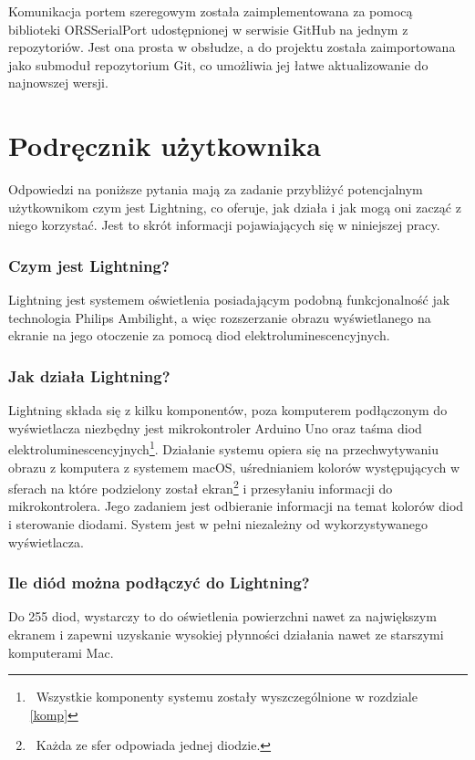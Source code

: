 \documentclass[12pt]{report}
\begin{document}
Komunikacja portem szeregowym została zaimplementowana za pomocą biblioteki ORSSerialPort udostępnionej w serwisie GitHub na jednym z repozytoriów. Jest ona prosta w obsłudze, a do projektu została zaimportowana jako submoduł repozytorium Git, co umożliwia jej łatwe aktualizowanie do najnowszej wersji.

\section{Podręcznik użytkownika}

Odpowiedzi na poniższe pytania mają za zadanie przybliżyć potencjalnym użytkownikom czym jest Lightning, co oferuje, jak działa i jak mogą oni zacząć z niego korzystać. Jest to skrót informacji pojawiających się w niniejszej pracy.

\subsubsection{Czym jest Lightning?}

Lightning jest systemem oświetlenia posiadającym podobną funkcjonalność jak technologia Philips Ambilight, a więc rozszerzanie obrazu wyświetlanego na ekranie na jego otoczenie za pomocą diod elektroluminescencyjnych.

\subsubsection{Jak działa Lightning?}

Lightning składa się z kilku komponentów, poza komputerem podłączonym do wyświetlacza niezbędny jest mikrokontroler Arduino Uno oraz taśma diod elektroluminescencyjnych\footnote{~Wszystkie komponenty systemu zostały wyszczególnione w rozdziale \ref{komp}}. Działanie systemu opiera się na przechwytywaniu obrazu z komputera z systemem macOS, uśrednianiem kolorów występujących w sferach na które podzielony został ekran\footnote{~Każda ze sfer odpowiada jednej diodzie.} i przesyłaniu informacji do mikrokontrolera. Jego zadaniem jest odbieranie informacji na temat kolorów diod i sterowanie diodami. System jest w pełni niezależny od wykorzystywanego wyświetlacza.

\subsubsection{Ile diód można podłączyć do Lightning?}

Do 255 diod, wystarczy to do oświetlenia powierzchni nawet za największym ekranem i zapewni uzyskanie wysokiej płynności działania nawet ze starszymi komputerami Mac.
\end{document}
